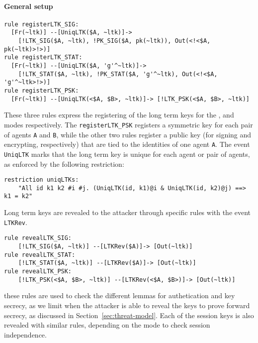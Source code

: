 
\paragraph{General setup}
\begin{lstlisting}
rule registerLTK_SIG:
  [Fr(~ltk)] --[UniqLTK($A, ~ltk)]->
    [!LTK_SIG($A, ~ltk), !PK_SIG($A, pk(~ltk)), Out(<!<$A, pk(~ltk)>!>)]
rule registerLTK_STAT:
  [Fr(~ltk)] --[UniqLTK($A, 'g'^~ltk)]->
    [!LTK_STAT($A, ~ltk), !PK_STAT($A, 'g'^~ltk), Out(<!<$A, 'g'^~ltk>!>)]
rule registerLTK_PSK:
  [Fr(~ltk)] --[UniqLTK(<$A, $B>, ~ltk)]-> [!LTK_PSK(<$A, $B>, ~ltk)]
\end{lstlisting}
These three rules express the registering of the long term keys for the \mSig,
\mStat and \mPsk modes respectively.
%
The \lstinline{registerLTK_PSK} registers a symmetric key for each pair of
agents \lstinline{A} and \lstinline{B}, while the other two rules register a
public key (for signing and encrypting, respectively) that are tied to the
identities of one agent \lstinline{A}.
%
The event \lstinline{UniqLTK} marks that the long term key is unique for each
agent or pair of agents, as enforced by the following restriction:
\begin{lstlisting}
restriction uniqLTKs:
    "All id k1 k2 #i #j. (UniqLTK(id, k1)@i & UniqLTK(id, k2)@j) ==> k1 = k2"
\end{lstlisting}

Long term keys are revealed to the attacker through specific rules
with the event \lstinline{LTKRev}.
\begin{lstlisting}
rule revealLTK_SIG:
    [!LTK_SIG($A, ~ltk)] --[LTKRev($A)]-> [Out(~ltk)]
rule revealLTK_STAT:
    [!LTK_STAT($A, ~ltk)] --[LTKRev($A)]-> [Out(~ltk)]
rule revealLTK_PSK:
    [!LTK_PSK(<$A, $B>, ~ltk)] --[LTKRev(<$A, $B>)]-> [Out(~ltk)]
\end{lstlisting}
these rules are used to check the different lemmas for authetication
and key secrecy, as we limit when the attacker is able to reveal the
keys to prove forward secrecy, as discussed in
Section~\ref{sec:threat-model}.
%
Each of the session keys is also revealed with similar rules,
depending on the mode to check session independence.

